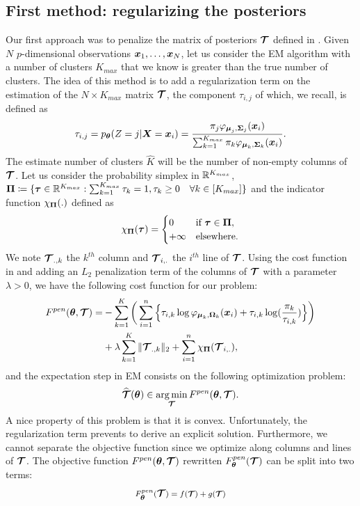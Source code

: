 \subsection{First method: regularizing the posteriors}\label{sec:tau_pen_estim}
Our first approach was to penalize the matrix of posteriors $\boldsymbol{\mathcal T}$ defined in . Given $N$ $p$-dimensional observations $\boldsymbol x_1,\dots,\boldsymbol x_N$, let us consider the EM algorithm with a number of clusters $K_{max}$ that we know is greater than the true number of clusters. The idea of this method is to add a regularization term on the estimation of the $N\times K_{max}$ matrix $\boldsymbol{\mathcal T}$, the component $\tau_{i,j}$ of which, we recall, is defined as 
\begin{equation}
  \tau_{i,j} = p_{{\boldsymbol\theta}}(Z=j | \boldsymbol X=\boldsymbol x_i) = \frac{\pi_j\varphi_{\boldsymbol\mu_j,\boldsymbol\Sigma_j}(\boldsymbol x_i)}{\sum_{k=1}^{K_{max}}\pi_k\varphi_{\boldsymbol\mu_k,\boldsymbol\Sigma_k}(\boldsymbol x_i)}.
\end{equation}
The estimate number of clusters $\hat K$ will be the number of non-empty columns of $\boldsymbol{\mathcal T}$. Let us consider the probability simplex in ${\mathbb R}^{K_{max}}$, $\boldsymbol\Pi\coloneqq \{\boldsymbol\tau \in {\mathbb R}^{K_{max}} : \sum_{k=1}^{K_{max}}\tau_k=1, \tau_k\geq 0 \quad \forall k \in [K_{max}] \}$ and the indicator function $\chi_{\boldsymbol\Pi}(.)$ defined as
\begin{equation*}
    \chi_{\boldsymbol\Pi}(\boldsymbol\tau) =
    \begin{cases}
      0 & \text{if } \boldsymbol\tau \in \boldsymbol\Pi,\\
        +\infty & \text{elsewhere}.
    \end{cases}
\end{equation*}
We note $\boldsymbol{\mathcal T}_{.,k}$ the $k^{th}$ column and $\boldsymbol{\mathcal T}_{i,.}$ the $i^{th}$ line of $\boldsymbol{\mathcal T}$. Using the cost function in  and adding an $L_2$ penalization term of the columns of $\boldsymbol{\mathcal T}$ with a parameter $\lambda > 0$, we have the following cost function for our problem:
\begin{align*}
F^{pen}({\boldsymbol\theta},\boldsymbol{\mathcal T})  =& -\sum_{k=1}^K \bigg(\sum_{i=1}^{n} \Big\{\tau_{i,k}\log\varphi_{\boldsymbol\mu_{k},\boldsymbol\Omega_{k}}(\boldsymbol x_i)+\tau_{i,k}\log(\frac{\pi_k}{\tau_{i,k}})\Big\}\bigg)\\
&+ \lambda\sum_{k=1}^K \|\boldsymbol{\mathcal T}_{.,k}\|_{2} + \sum_{i=1}^{n} \chi_{\boldsymbol\Pi}(\boldsymbol{\mathcal T}_{i,.}),
\end{align*}
 and the expectation step in EM consists on the following optimization problem:
\begin{equation}
\widehat{\boldsymbol{\mathcal T}}({\boldsymbol\theta})\in \operatorname*{arg\,min}_{\boldsymbol{\mathcal T}} F^{pen}({\boldsymbol\theta},\boldsymbol{\mathcal T}).
\end{equation}
A nice property of this problem is that it is convex. Unfortunately, the regularization term prevents to derive an explicit solution. Furthermore, we cannot separate the objective function since we optimize along columns and lines of $\boldsymbol{\mathcal T}$. The objective function $F^{pen}({\boldsymbol\theta},\boldsymbol{\mathcal T})$ rewritten $F^{pen}_{{\boldsymbol\theta}}(\boldsymbol{\mathcal T})$ can be split into two terms:
\begin{equation}
F^{pen}_{{\boldsymbol\theta}}(\boldsymbol{\mathcal T})={\large f}({\footnotesize\boldsymbol{\mathcal T}})+ {\large g}({\footnotesize\boldsymbol{\mathcal T}})
\end{equation}

